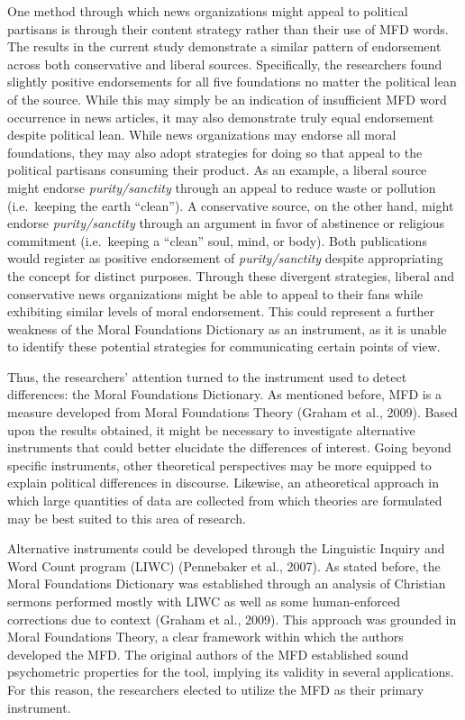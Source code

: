 \documentclass[english,,man]{apa6}
\begin{document}
One method through which news organizations might appeal to political partisans is through their content strategy rather than their use of MFD words. The results in the current study demonstrate a similar pattern of endorsement across both conservative and liberal sources. Specifically, the researchers found slightly positive endorsements for all five foundations no matter the political lean of the source. While this may simply be an indication of insufficient MFD word occurrence in news articles, it may also demonstrate truly equal endorsement despite political lean. While news organizations may endorse all moral foundations, they may also adopt strategies for doing so that appeal to the political partisans consuming their product. As an example, a liberal source might endorse \emph{purity/sanctity} through an appeal to reduce waste or pollution (i.e.~keeping the earth \enquote{clean}). A conservative source, on the other hand, might endorse \emph{purity/sanctity} through an argument in favor of abstinence or religious commitment (i.e.~keeping a \enquote{clean} soul, mind, or body). Both publications would register as positive endorsement of \emph{purity/sanctity} despite appropriating the concept for distinct purposes. Through these divergent strategies, liberal and conservative news organizations might be able to appeal to their fans while exhibiting similar levels of moral endorsement. This could represent a further weakness of the Moral Foundations Dictionary as an instrument, as it is unable to identify these potential strategies for communicating certain points of view.

Thus, the researchers' attention turned to the instrument used to detect differences: the Moral Foundations Dictionary. As mentioned before, MFD is a measure developed from Moral Foundations Theory (Graham et al., 2009). Based upon the results obtained, it might be necessary to investigate alternative instruments that could better elucidate the differences of interest. Going beyond specific instruments, other theoretical perspectives may be more equipped to explain political differences in discourse. Likewise, an atheoretical approach in which large quantities of data are collected from which theories are formulated may be best suited to this area of research.

Alternative instruments could be developed through the Linguistic Inquiry and Word Count program (LIWC) (Pennebaker et al., 2007). As stated before, the Moral Foundations Dictionary was established through an analysis of Christian sermons performed mostly with LIWC as well as some human-enforced corrections due to context (Graham et al., 2009). This approach was grounded in Moral Foundations Theory, a clear framework within which the authors developed the MFD. The original authors of the MFD established sound psychometric properties for the tool, implying its validity in several applications. For this reason, the researchers elected to utilize the MFD as their primary instrument.
\end{document}
